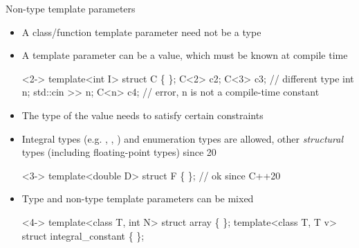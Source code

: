 \begin{frame}[fragile]{Non-type template parameters}
  \begin{itemize}
  \item A class/function template parameter need not be a type
  \item A template parameter can be a value, which must be known at compile time

    \begin{codeblock}<2->{
template<int I> struct C \{ \ddd \};
C<2> c2;
C<3> c3;              // different type
int n; std::cin >> n;
C<n> c4;              // error, n is not a compile-time constant}\end{codeblock}

  \item<3-> The type of the value needs to satisfy certain constraints
  \item<3-> Integral types (e.g. , , ) and
    enumeration types are allowed, other \textit{structural} types (including
    floating-point types) since \Cpp{}20

    \begin{codeblock}<3->{
template<double D> struct F \{ \ddd \}; // ok since C++20}\end{codeblock}

\item<4-> Type and non-type template parameters can be mixed

  \begin{codeblock}<4->{
template<class T, int N> struct array \{ \ddd \};
template<class T, T v> struct integral_constant \{ \ddd \};}\end{codeblock}

  \end{itemize}

\end{frame}

